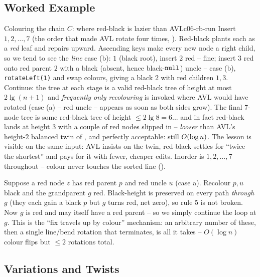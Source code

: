 \subsection{Worked Example}

\begin{example}{Colouring the chain $C$: where red-black is lazier than AVL}{c06-rb-run}
Insert $1,2,\dots,7$ (the order that made AVL rotate four times, ). Red-black plants
each as a \emph{red} leaf and repairs upward. Ascending keys make every new node a right child, so we
tend to see the \emph{line} case (b): $1$ (black root), insert $2$ red -- fine; insert $3$ red onto red
parent $2$ with a black (absent, hence black-$\texttt{null}$) uncle -- case (b), \texttt{rotateLeft(1)} and swap
colours, giving a black $2$ with red children $1,3$. Continue: the tree at each stage is a valid
red-black tree of height at most $2\lg(n+1)$ and \emph{frequently only recolouring} is invoked where AVL
would have rotated (case (a) -- red uncle -- appears as soon as both sides grow). The final 7-node tree is
some red-black tree of height $\le 2\lg 8 = 6$... and in fact red-black lands at height $3$ with a couple
of red nodes slipped in -- \emph{looser} than AVL's height-$2$ balanced twin of , and
perfectly acceptable: still $O(\log n)$. The lesson is visible on the same input: AVL insists on the
twin, red-black settles for ``twice the shortest'' and pays for it with fewer, cheaper edits. Inorder is
$1,2,\dots,7$ throughout -- colour never touches the sorted line ().
\end{example}

\begin{tracebox}
Suppose a red node $z$ has red parent $p$ and red uncle $u$ (case a). Recolour $p,u$ black and the
grandparent $g$ red. Black-height is preserved on every path \emph{through} $g$ (they each gain a black
$p$ but $g$ turns red, net zero), so rule 5 is not broken. Now $g$ is red and may itself have a red
parent -- so we simply continue the loop at $g$. This is the ``fix travels up by colour'' mechanism: an
arbitrary number of these, then a single line/bend rotation that terminates, is all it takes -- $O(\log n)$
colour flips but $\le 2$ rotations total.
\end{tracebox}

\subsection{Variations and Twists}

